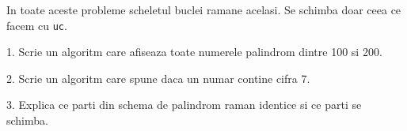 \begin{guidebox}
  In toate aceste probleme scheletul buclei ramane acelasi. Se schimba doar ceea ce facem cu \texttt{uc}.
\end{guidebox}

\newpage
{}

\begin{solobox}
  1. Scrie un algoritm care afiseaza toate numerele palindrom dintre 100 si 200.

  2. Scrie un algoritm care spune daca un numar contine cifra 7.

  3. Explica ce parti din schema de palindrom raman identice si ce parti se schimba.
\end{solobox}
